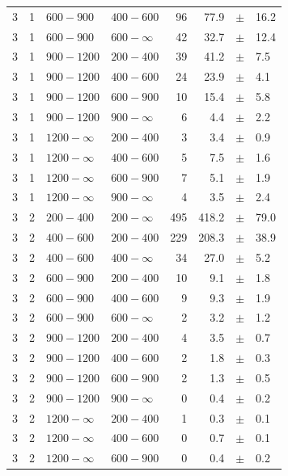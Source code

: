 \begin{table}[!h]
\begin{tabular}{rrllrrcl}
		3 & 1 & $ 600- 900$ & $400-600$ &     96 &     77.9 &$\pm$&   16.2 \\
		3 & 1 & $ 600- 900$ & $600-\infty$ &     42 &     32.7 &$\pm$&   12.4 \\
		3\T & 1 & $ 900-1200$ & $200-400$ &     39 &     41.2 &$\pm$&    7.5 \\
		3 & 1 & $ 900-1200$ & $400-600$ &     24 &     23.9 &$\pm$&    4.1 \\
		3 & 1 & $ 900-1200$ & $600-900$ &     10 &     15.4 &$\pm$&    5.8 \\
		3 & 1 & $ 900-1200$ & $900-\infty$ &      6 &      4.4 &$\pm$&    2.2 \\
		3\T & 1 & $1200- \infty$ & $200-400$ &      3 &      3.4 &$\pm$&    0.9 
		\\
		3 & 1 & $1200- \infty$ & $400-600$ &      5 &      7.5 &$\pm$&    1.6 \\
		3 & 1 & $1200- \infty$ & $600-900$ &      7 &      5.1 &$\pm$&    1.9 \\
		3 & 1 & $1200- \infty$ & $900-\infty$ &      4 &      3.5 &$\pm$&    
		2.4 \\
		3\T & 2 & $ 200- 400$ & $200-\infty$ &    495 &    418.2 &$\pm$&   79.0 
		\\
		3\T & 2 & $ 400- 600$ & $200-400$ &    229 &    208.3 &$\pm$&   38.9 \\
		3 & 2 & $ 400- 600$ & $400-\infty$ &     34 &     27.0 &$\pm$&    5.2 \\
		3\T & 2 & $ 600- 900$ & $200-400$ &     10 &      9.1 &$\pm$&    1.8 \\
		3 & 2 & $ 600- 900$ & $400-600$ &      9 &      9.3 &$\pm$&    1.9 \\
		3 & 2 & $ 600- 900$ & $600-\infty$ &      2 &      3.2 &$\pm$&    1.2 \\
		3\T & 2 & $ 900-1200$ & $200-400$ &      4 &      3.5 &$\pm$&    0.7 \\
		3 & 2 & $ 900-1200$ & $400-600$ &      2 &      1.8 &$\pm$&    0.3 \\
		3 & 2 & $ 900-1200$ & $600-900$ &      2 &      1.3 &$\pm$&    0.5 \\
		3 & 2 & $ 900-1200$ & $900-\infty$ &      0 &      0.4 &$\pm$&    0.2 \\
		3\T & 2 & $1200- \infty$ & $200-400$ &      1 &      0.3 &$\pm$&    0.1 
		\\
		3 & 2 & $1200- \infty$ & $400-600$ &      0 &      0.7 &$\pm$&    0.1 \\
		3 & 2 & $1200- \infty$ & $600-900$ &      0 &      0.4 &$\pm$&    0.2 \\

\end{tabular}
\end{table}
